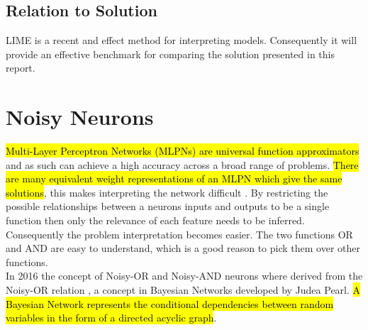 \subsection{Relation to Solution}
LIME is a recent and effect method for interpreting models. Consequently it will provide an effective benchmark for comparing the solution presented in this report.

\section{Noisy Neurons} \label{sec:background-noisy-neurons}
\hl{Multi-Layer Perceptron Networks (MLPNs) are universal function approximators} and as such can achieve a high accuracy across a broad range of problems. \hl{There are many equivalent weight representations of an MLPN which give the same solutions}, this makes interpreting the network difficult \cite{LearningLogicalActivations}. By restricting the possible relationships between a neurons inputs and outputs to be a single function then only the relevance of each feature needs to be inferred. Consequently the problem interpretation becomes easier. The two functions OR and AND are easy to understand, which is a good reason to pick them over other functions.\\

In 2016 the concept of Noisy-OR and Noisy-AND neurons \cite{LearningLogicalActivations} where derived from the Noisy-OR relation \cite{russell1995modern}, a concept in Bayesian Networks developed by Judea Pearl. \hl{A Bayesian Network represents the conditional dependencies between random variables in the form of a directed acyclic graph}.

